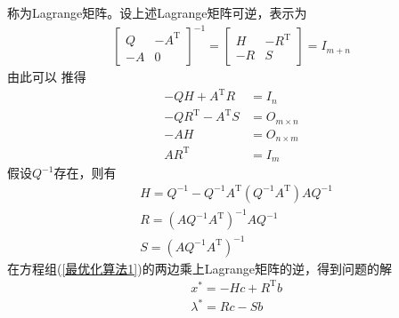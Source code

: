         称为Lagrange矩阵。设上述Lagrange矩阵可逆，表示为
        \begin{align*}
        \begin{bmatrix} Q & -A^\mathrm{T}  \\
        -A & 0 \end{bmatrix}^{-1} = \begin{bmatrix} H & -R^\mathrm{T}  \\
        -R & S \end{bmatrix}=I_{m+n}
        \end{align*}
        由此可以
        推得
        \begin{align*}
         -QH+A^\mathrm{T} R &= I_n \\
         -QR^\mathrm{T} -A^\mathrm{T} S &= O_{m\times n} \\
         -AH &=O_{n\times m}\\
         AR^\mathrm{T} &=I_m
        \end{align*}
        假设$Q^{-1}$存在，则有
        \begin{align*}
        & H = Q^{-1}-Q^{-1}A^\mathrm{T} (Q^{-1}A^\mathrm{T} )AQ^{-1} \\
        & R = (AQ^{-1}A^\mathrm{T} )^{-1}AQ^{-1} \\
        & S = (AQ^{-1}A^\mathrm{T} )^{-1}
        \end{align*}
        在方程组(\ref{最优化算法1})的两边乘上Lagrange矩阵的逆，得到问题的解
        \begin{align*}
        & x^* = -Hc+R^\mathrm{T} b \\
        & {\lambda}^*=Rc-Sb
        \end{align*}
